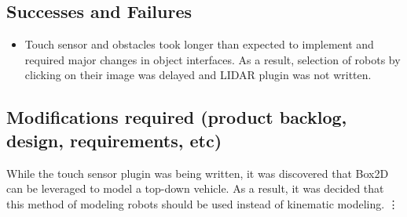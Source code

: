 \subsection{Successes and Failures}
\begin{itemize}
	\item Touch sensor and obstacles took longer than expected to implement and required major changes in object interfaces. As a result, selection of robots by clicking on their image was delayed and LIDAR plugin was not written.
\end{itemize}
\subsection{Modifications required (product backlog, design, requirements, etc)}
While the touch sensor plugin was being written, it was discovered that Box2D can be leveraged to model a top-down vehicle. As a result, it was decided that this method of modeling robots should be used instead of kinematic modeling.
\vdots

